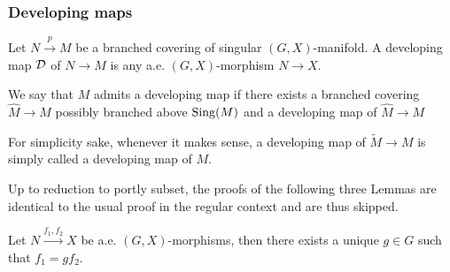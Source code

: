 \subsubsection{Developing maps}
\begin{defi}\label{def:developing_map}
  Let $N\xrightarrow{p} M$ be a branched covering of singular $(G,X)$-manifold.
  A developing map $\mathcal{D}$ of $N\rightarrow M$ is any a.e. $(G,X)$-morphism $N \rightarrow X$. 
  
  We say that $M$ admits a developing map if there exists a branched covering $\widehat M \rightarrow M$ possibly branched above $\mathrm{Sing}(M)$ and a developing map of $\widehat M \rightarrow M$
  
   For simplicity sake, whenever it makes sense, a developing map of $\widetilde M\rightarrow M$ is simply called a developing map of $M$. 
  \end{defi}







Up to reduction to portly subset, the proofs of the following three Lemmas are identical to the usual proof in the regular context and are thus skipped.  
\begin{lem}\label{lem:MtoXG}
  Let $N\xrightarrow{f_1,f_2} X$ be a.e.  $(G,X)$-morphisms,
then there exists a unique $g\in G$ such that $f_1=gf_2$.
\end{lem}

